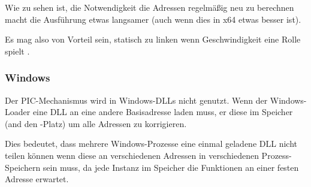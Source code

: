 Wie zu sehen ist, die Notwendigkeit die Adressen regelmäßig neu zu berechnen macht die Ausführung
etwas langsamer (auch wenn dies in x64 etwas besser ist).

Es mag also von Vorteil sein, statisch zu linken wenn Geschwindigkeit eine Rolle spielt .

\subsubsection{Windows}

Der PIC-Mechanismus wird in Windows-DLLs nicht genutzt. Wenn der Windows-Loader eine DLL an
eine andere Basisadresse laden muss,  er diese im Speicher (and den -Platz)
um alle Adressen zu korrigieren.

Dies bedeutet, dass mehrere Windows-Prozesse eine einmal geladene DLL nicht teilen können
wenn diese an verschiedenen Adressen in verschiedenen Prozess-Speichern sein muss, da
jede Instanz im Speicher die Funktionen an einer festen Adresse erwartet.
